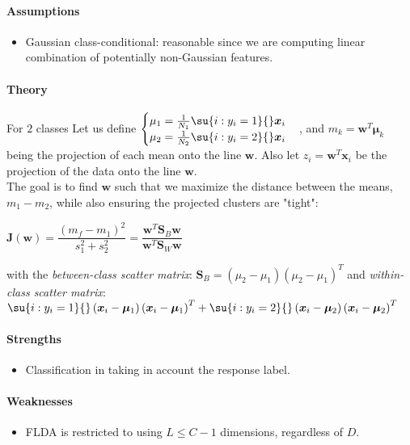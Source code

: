 \paragraph{Assumptions}
\begin{itemize}
    \item Gaussian class-conditional: reasonable since we are computing linear 
        combination of potentially non-Gaussian features.
\end{itemize}

\paragraph{Theory}
For $2$ classes
Let us define 
$\begin{cases}
    \mu_{1} = \frac{1}{N_{1}}\su{i:y_{i}=1}{}\bm{x}_{i}\\
    \mu_{2} = \frac{1}{N_{2}}\su{i:y_{i}=2}{}\bm{x}_{i}
\end{cases}$,
and $m_{k} = \bm{w}^{T}\bm{\mu}_{k}$ being the projection of each mean onto the line
$\bm{w}$. Also let $z_{i}=\bm{w}^{T}\bm{x}_{i}$ be the projection of the data onto the 
line $\bm{w}$.\\
The goal is to find $\bm{w}$ such that we maximize the distance between the means,
$m_{1} - m_{2}$, while also ensuring the projected clusters are "tight":
\begin{center}
    $\bm{J}(\bm{w}) = \dfrac{(m_{f} - m_{1})^{2}}{s_{1}^{2} + s_{2}^{2}}
    = \dfrac{\bm{w}^{T}\bm{S}_{B}\bm{w}}{\bm{w}^{T}\bm{S}_{W}\bm{w}}$
\end{center}
with the \emph{between-class scatter matrix}: $\bm{S}_{B} = \left(\mu_{2} - \mu_{1}
\right)\left(\mu_{2} - \mu_{1}\right)^{T}$ and \emph{within-class scatter matrix}:
$
\su{i:y_{i}=1}{}\left(\bm{x}_{i} - \bm{\mu}_{1}\right) \left(\bm{x}_{i} - 
\bm{\mu}_{1}\right)^{T} + \su{i:y_{i}=2}{}\left(\bm{x}_{i} - \bm{\mu}_{2}\right)\left(
\bm{x}_{i} - \bm{\mu}_{2}\right)^{T}
$


\paragraph{Strengths}
\begin{itemize}
    \item Classification in taking in account the response label.
\end{itemize}

\paragraph{Weaknesses}
\begin{itemize}
    \item FLDA is restricted to using $L\leq C-1$ dimensions, regardless of $D$.
\end{itemize}

